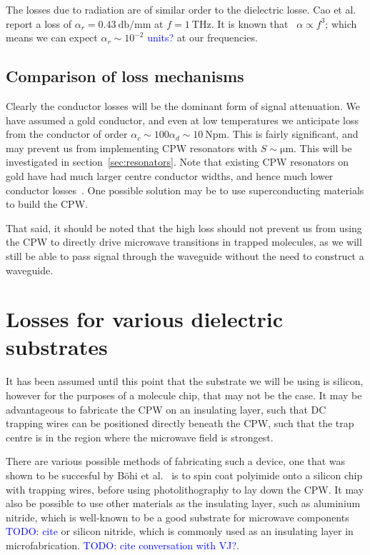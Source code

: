 \documentclass[a4paper]{article}
\newcommand{\cm}[1]{\textcolor{blue}{#1}} %
\begin{document}
The losses due to radiation are of similar order to the dielectric losse. Cao et
al.~\cite{L.Cao2013} report a loss of $\alpha_r = \SI{0.43}{\decibel \per \milli
\meter}$ at $f=\SI{1}{\tera\hertz}$. It is known that~\cite{81658} $\alpha
\propto f^3$; which means we can expect $\alpha_r \sim 10^{-2}$ \cm{units?} at
our frequencies.

\subsection{Comparison of loss mechanisms}

Clearly the conductor losses will be the dominant form of signal attenuation. We
have assumed a gold conductor, and even at low temperatures we anticipate loss
from the conductor of order $\alpha_c \sim 100 \alpha_d \sim
\SI{10}{\neper\meter}$. This is fairly significant, and may prevent us from
implementing CPW resonators with $S\sim\si{\micro\meter}$. This will be
investigated in section~\ref{sec:resonators}. Note that existing
CPW resonators on gold have had much larger centre conductor widths, and hence
much lower conductor losses~\cite{1127105}. One possible solution may be to use
superconducting materials to build the CPW.

That said, it should be noted that the high loss should not prevent us from
using the CPW to directly drive microwave transitions in trapped molecules, as
we will still be able to pass signal through the waveguide without the need to
construct a waveguide.


\section{Losses for various dielectric substrates}

It has been assumed until this point that the substrate we will be using is
silicon, however for the purposes of a molecule chip, that may not be the case.
It may be advantageous to fabricate the CPW on an insulating layer, such that
DC trapping wires can be positioned directly beneath the CPW, such that the trap
centre is in the region where the microwave field is strongest.

There are various possible methods of fabricating such a device, one that was
shown to be succesful by B\"ohi et al.~\cite{Boehi2009} is to spin coat
polyimide onto a silicon chip with trapping wires, before using photolithography
to lay down the CPW. It may also be possible to use other materials as the
insulating layer, such as aluminium nitride, which is well-known to be a good
substrate for microwave components \cm{TODO: cite} or silicon nitride, which is
commonly used as an insulating layer in microfabrication. \cm{TODO: cite
conversation with VJ?}.
\end{document}
